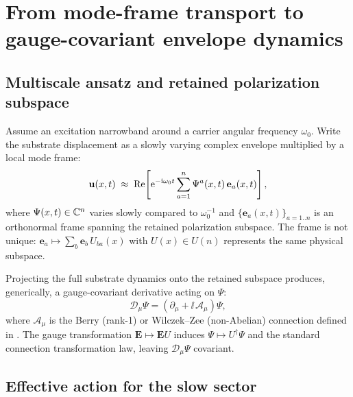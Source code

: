 \section{From mode-frame transport to gauge-covariant envelope dynamics}
\label{sec:effective-field}

\subsection{Multiscale ansatz and retained polarization subspace}

Assume an excitation narrowband around a carrier angular frequency $\omega_0$.
Write the substrate displacement as a slowly varying complex envelope multiplied by a local mode frame:
\begin{equation}
  \mathbf{u}(x,t)\;\approx\;
  \mathrm{Re}\!\left[
    \mathrm{e}^{-\mathrm{i}\omega_0 t}\sum_{a=1}^{n}\Psi^a(x,t)\,\mathbf{e}_a(x,t)
  \right],
  \label{eq:multiscale-ansatz}
\end{equation}
where $\Psi(x,t)\in\mathbb{C}^n$ varies slowly compared to $\omega_0^{-1}$ and
$\{\mathbf{e}_a(x,t)\}_{a=1..n}$ is an orthonormal frame spanning the retained polarization subspace.
The frame is not unique: $\mathbf{e}_a\mapsto \sum_b \mathbf{e}_b\,U_{ba}(x)$ with $U(x)\in U(n)$ represents the same
physical subspace.

Projecting the full substrate dynamics onto the retained subspace produces, generically, a gauge-covariant derivative
acting on $\Psi$:
\begin{equation}
  \mathcal{D}_\mu \Psi
  =
  \left(\partial_\mu + \ii\,\mathcal{A}_\mu\right)\Psi,
  \label{eq:covD}
\end{equation}
where $\mathcal{A}_\mu$ is the Berry (rank-1) or Wilczek--Zee (non-Abelian) connection defined in .
The gauge transformation $\mathbf{E}\mapsto \mathbf{E}U$ induces $\Psi\mapsto U^\dagger\Psi$ and the standard
connection transformation law, leaving $\mathcal{D}_\mu\Psi$ covariant.

\subsection{Effective action for the slow sector}


